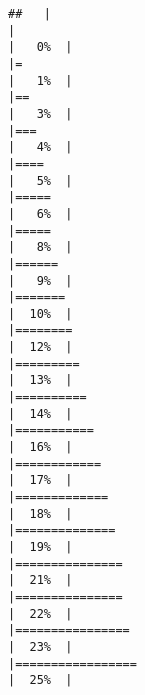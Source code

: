 \documentclass[
]{article}
\begin{document}
\begin{verbatim}
##   |                                                                              |                                                                      |   0%  |                                                                              |=                                                                     |   1%  |                                                                              |==                                                                    |   3%  |                                                                              |===                                                                   |   4%  |                                                                              |====                                                                  |   5%  |                                                                              |=====                                                                 |   6%  |                                                                              |=====                                                                 |   8%  |                                                                              |======                                                                |   9%  |                                                                              |=======                                                               |  10%  |                                                                              |========                                                              |  12%  |                                                                              |=========                                                             |  13%  |                                                                              |==========                                                            |  14%  |                                                                              |===========                                                           |  16%  |                                                                              |============                                                          |  17%  |                                                                              |=============                                                         |  18%  |                                                                              |==============                                                        |  19%  |                                                                              |===============                                                       |  21%  |                                                                              |===============                                                       |  22%  |                                                                              |================                                                      |  23%  |                                                                              |=================                                                     |  25%  |                                                                              
\end{verbatim}
\end{document}
